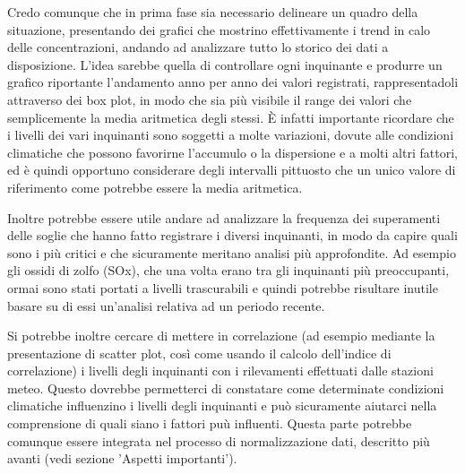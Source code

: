 \documentclass{article}
\begin{document}
Credo comunque che in prima fase sia necessario delineare un quadro della situazione, presentando dei grafici che mostrino effettivamente i trend in calo delle concentrazioni, andando ad analizzare tutto lo storico dei dati a disposizione. L'idea sarebbe quella di controllare ogni inquinante e produrre un grafico riportante l'andamento anno per anno dei valori registrati, rappresentadoli attraverso dei box plot, in modo che sia più visibile il range dei valori che semplicemente la media aritmetica degli stessi. È infatti importante ricordare che i livelli dei vari inquinanti sono soggetti a molte variazioni, dovute alle condizioni climatiche che possono favorirne l'accumulo o la dispersione e a molti altri fattori, ed è quindi opportuno considerare degli intervalli pittuosto che un unico valore di riferimento come potrebbe essere la media aritmetica.

Inoltre potrebbe essere utile andare ad analizzare la frequenza dei superamenti delle soglie che hanno fatto registrare i diversi inquinanti, in modo da capire quali sono i più critici e che sicuramente meritano analisi più approfondite. Ad esempio gli ossidi di zolfo (SOx), che una volta erano tra gli inquinanti più preoccupanti, ormai sono stati portati a livelli trascurabili e quindi potrebbe risultare inutile basare su di essi un'analisi relativa ad un periodo recente.

Si potrebbe inoltre cercare di mettere in correlazione (ad esempio mediante la presentazione di scatter plot, così come usando il calcolo dell'indice di correlazione) i livelli degli inquinanti con i rilevamenti effettuati dalle stazioni meteo. Questo dovrebbe permetterci di constatare come determinate condizioni climatiche influenzino i livelli degli inquinanti e può sicuramente aiutarci nella comprensione di quali siano i fattori puù influenti. Questa parte potrebbe comunque essere integrata nel processo di normalizzazione dati, descritto più avanti (vedi sezione 'Aspetti importanti').
\end{document}
